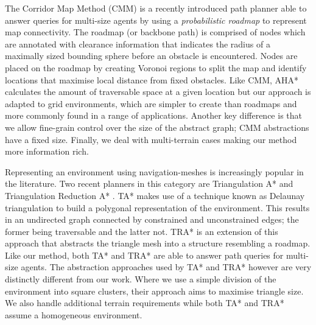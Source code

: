 \par
\indent The Corridor Map Method (CMM) \cite{geraerts07} is a recently introduced path planner able to answer queries for multi-size agents by using a \emph{probabilistic roadmap} to represent map connectivity. 
The roadmap (or backbone path) is comprised of nodes which are annotated with clearance information that indicates the radius of a maximally sized bounding sphere before an obstacle is encountered. 
Nodes are placed on the roadmap by creating Voronoi regions to split the map and identify locations that maximise local distance from fixed obstacles. 
Like CMM, AHA* calculates the amount of traversable space at a given location but our approach is adapted to grid environments, which are simpler to create than roadmaps and more commonly found in a range of applications. 
Another key difference is that we allow fine-grain control over the size of the abstract graph; CMM abstractions have a fixed size.
Finally, we deal with multi-terrain cases making our method more information rich. 
\par \indent 
Representing an environment using navigation-meshes is increasingly popular in the literature. 
Two recent planners in this category are Triangulation A* and Triangulation Reduction A* \cite{demyen07}. 
TA* makes use of a technique known as Delaunay triangulation to build a polygonal representation of the environment. 
This results in an undirected graph connected by constrained and unconstrained edges; the former being traversable and the latter not. 
TRA* is an extension of this approach that abstracts the triangle mesh into a structure resembling a roadmap. 
Like our method, both TA* and TRA* are able to answer path queries for multi-size agents. 
The abstraction approaches used by TA* and TRA* however are very distinctly different from our work. 
Where we use a simple division of the environment into square clusters, their approach aims to maximise triangle size. 
We also handle additional terrain requirements while both TA* and TRA* assume a homogeneous environment.

